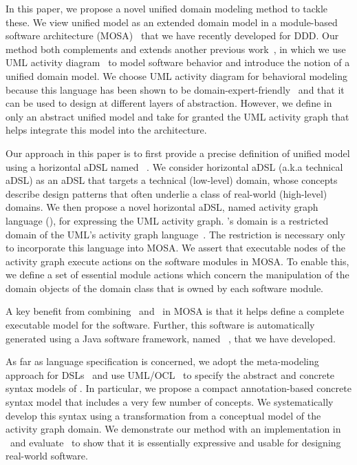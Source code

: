 In this paper, we propose a novel unified domain modeling method to tackle these. 
We view unified model as an extended domain model in a module-based software architecture (MOSA)~\cite{le_tree-based_2015, le_generative_2017, le_generative_2018} that we have recently developed for DDD.
Our method both complements and extends another previous work~\cite{le_domain_2018}, in which we use 
UML activity diagram~\cite{omg_unified_2015} to model software behavior and introduce the notion of a unified domain model.
We choose UML activity diagram for behavioral modeling because this language has been shown to be domain-expert-friendly~\cite{dumas_uml_2001} and that it can be used to design at different layers of abstraction. 
However, we define in~\cite{le_domain_2018} only an abstract unified model and take for granted the UML activity graph that helps integrate this model into the architecture.

Our approach in this paper is to first provide a precise definition of unified model using a horizontal aDSL named \dcsl~\cite{le_domain_2018}. We consider horizontal aDSL (a.k.a technical aDSL) as an aDSL that targets a technical (low-level) domain, whose concepts describe design patterns that often underlie a class of real-world (high-level) domains. 
%
We then propose a novel horizontal aDSL, named activity graph language (\agl), for expressing the UML activity graph. \agl's domain is a restricted domain of the UML's activity graph language~\cite{omg_unified_2015}. The restriction is necessary only to incorporate this language into MOSA. We assert that executable nodes of the activity graph execute actions on the software modules in MOSA. To enable this, we define a set of essential module actions which concern the manipulation of the domain objects of the domain class that is owned by each software module.

A key benefit from combining \dcsl~and \agl~in MOSA is that it helps define a complete executable model for the software. Further, this software is automatically generated using a Java software framework, named \jdomainapp~\cite{le_jdomainapp_2017}, that we have developed.

As far as language specification is concerned, we adopt the meta-modeling approach for DSLs~\cite{kleppe_software_2008} and use UML/OCL~\cite{omg_unified_2015, omg_object_2014} to specify the abstract and concrete syntax models of \agl. In particular, we propose a compact annotation-based concrete syntax model that includes a very few number of concepts. We systematically develop this syntax using a transformation from a conceptual model of the activity graph domain.
%
We demonstrate our method with an implementation in \jdomainapp~and evaluate \agl~to show that it is essentially expressive and usable for designing real-world software. 

